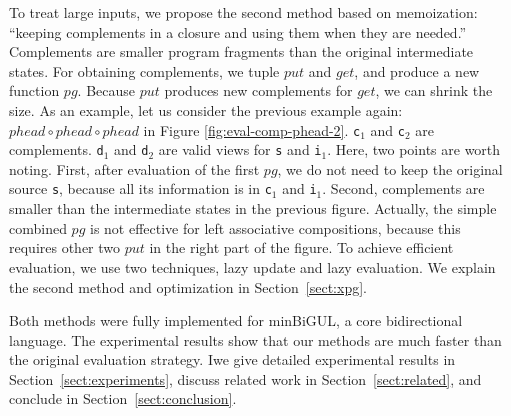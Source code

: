 To treat large inputs, we propose the second method based on memoization: ``keeping complements in a closure and using them when they are needed.'' Complements are smaller program fragments than the original intermediate states.
%
%
For obtaining complements, we tuple $put$ and $get$, and produce a new function $pg$. Because $put$ produces new complements for $get$, we can shrink the size.
As an example, let us consider the previous example again: $phead \circ phead \circ phead$ in Figure \ref{fig:eval-comp-phead-2}. \texttt{c$_1$} and \texttt{c$_2$} are complements. \texttt{d$_1$} and \texttt{d$_2$} are valid views for \texttt{s} and \texttt{i$_1$}. Here, two points are worth noting. First, after evaluation of the first $pg$, we do not need to keep the original source \texttt{s}, because all its information is in \texttt{c$_1$} and \texttt{i$_1$}. Second, complements are smaller than the intermediate states in the previous figure.
Actually, the simple combined $pg$ is not effective for left associative compositions, because this requires other two $put$ in the right part of the figure. To achieve efficient evaluation, we use two techniques, lazy update and lazy evaluation. We explain the second method and optimization in Section~\ref{sect:xpg}.

Both methods were fully implemented for minBiGUL, a core bidirectional language. The experimental results show that our methods are much faster than the original evaluation strategy.
Iwe give detailed experimental results in Section~\ref{sect:experiments}, discuss related work in Section~\ref{sect:related}, and conclude in Section~\ref{sect:conclusion}.



